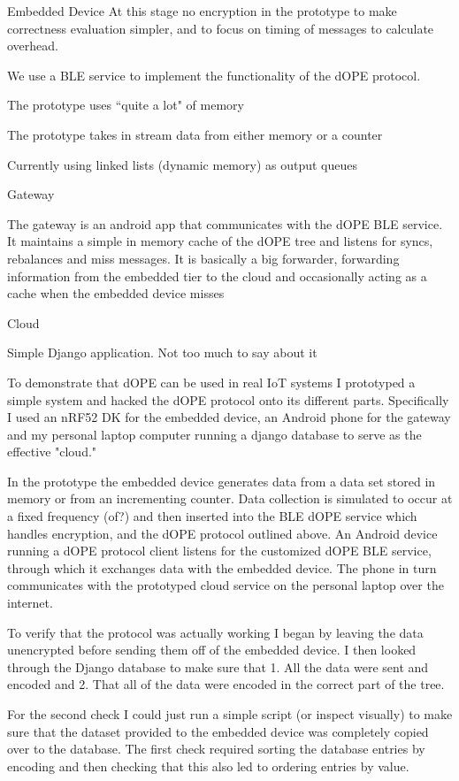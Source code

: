 \documentclass[12pt]{article}
\begin{document}
Embedded Device
At this stage no encryption in the prototype to make correctness evaluation simpler, and to focus on timing of messages to calculate overhead.

We use a BLE service to implement the functionality of the dOPE protocol.  

The prototype uses ``quite a lot" of memory

The prototype takes in stream data from either memory or a counter

Currently using linked lists (dynamic memory) as output queues 

Gateway

The gateway is an android app that communicates with the dOPE BLE service.  It maintains a simple in memory cache of the dOPE tree and listens for syncs, rebalances and miss messages.  It is basically a big forwarder, forwarding information from the embedded tier to the cloud and occasionally acting as a cache when the embedded device misses

Cloud

Simple Django application.  Not too much to say about it


To demonstrate that dOPE can be used in real IoT systems I prototyped a simple system and hacked the dOPE protocol onto its different parts.  Specifically I used an nRF52 DK for the embedded device, an Android phone for the gateway and my personal laptop computer running a django database to serve as the effective "cloud."  

In the prototype the embedded device generates data from a data set stored in memory or from an incrementing counter.  Data collection is simulated to occur at a fixed frequency (of?) and then inserted into the BLE dOPE service which handles encryption, and the dOPE protocol outlined above.  An Android device running a dOPE protocol client listens for the customized dOPE BLE service, through which it exchanges data with the embedded device.  The phone in turn communicates with the prototyped cloud service on the personal laptop over the internet.

To verify that the protocol was actually working I began by leaving the data unencrypted before sending them off of the embedded device.  I then looked through the Django database to make sure that 
1. All the data were sent and encoded and 
2. That all of the data were encoded in the correct part of the tree.

For the second check I could just run a simple script (or inspect visually) to make sure that the dataset provided to the embedded device was completely copied over to the database.  The first check required sorting the database entries by encoding and then checking that this also led to ordering entries by value.
\end{document}

